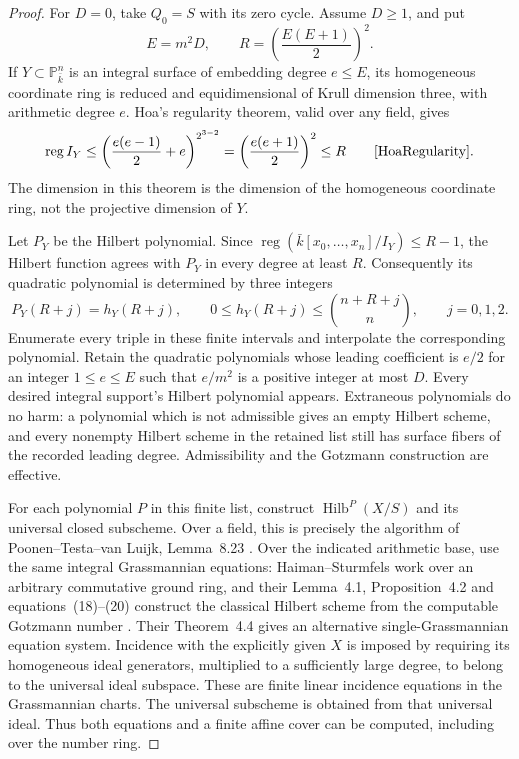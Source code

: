 \begin{proof}
For $D=0$, take $Q_0=S$ with its zero cycle. Assume $D\geq1$, and put
\[
 E=m^2D,\qquad R=\left(\frac{E(E+1)}2\right)^2.
\]
If $Y\subset\mathbb P^n_{\bar k}$ is an integral surface of embedding
degree $e\leq E$, its homogeneous coordinate ring is reduced and
equidimensional of Krull dimension three, with arithmetic degree $e$.
Hoa's regularity theorem, valid over any field, gives
\[
 \operatorname{reg}I_Y
 \leq\left(\frac{e(e-1)}2+e\right)^{2^{3-2}}
 =\left(\frac{e(e+1)}2\right)^2\leq R
 \qquad\text{\cite[Theorem 0.2, author PDF p.~2]{HoaRegularity}}.
\]
The dimension in this theorem is the dimension of the homogeneous
coordinate ring, not the projective dimension of $Y$.

Let $P_Y$ be the Hilbert polynomial. Since
$\operatorname{reg}(\bar k[x_0,\ldots,x_n]/I_Y)\leq R-1$, the
Hilbert function agrees with $P_Y$ in every degree at least $R$.
Consequently its quadratic polynomial is determined by three integers
\[
 P_Y(R+j)=h_Y(R+j),\qquad
 0\leq h_Y(R+j)\leq\binom{n+R+j}{n},\qquad j=0,1,2.
\]
Enumerate every triple in these finite intervals and interpolate the
corresponding polynomial. Retain the quadratic polynomials whose
leading coefficient is $e/2$ for an integer $1\leq e\leq E$ such
that $e/m^2$ is a positive integer at most $D$. Every desired integral
support's Hilbert polynomial appears. Extraneous polynomials do no
harm: a polynomial which is not admissible gives an empty Hilbert
scheme, and every nonempty Hilbert scheme in the retained list still
has surface fibers of the recorded leading degree. Admissibility and
the Gotzmann construction are effective.

For each polynomial $P$ in this finite list, construct
$\operatorname{Hilb}^P(X/S)$ and its universal closed subscheme.
Over a field, this is precisely the algorithm of
Poonen--Testa--van Luijk, Lemma~8.23
\cite[author PDF p.~15]{PoonenTestaVanLuijk}. Over the indicated
arithmetic base, use the same integral Grassmannian equations:
Haiman--Sturmfels work over an arbitrary commutative ground ring, and
their Lemma~4.1, Proposition~4.2 and equations~(18)--(20) construct the
classical Hilbert scheme from the computable Gotzmann number
\cite[\S4, author PDF pp.~19--21]{HaimanSturmfels}.
Their Theorem~4.4 gives an alternative single-Grassmannian equation
system. Incidence with the explicitly given $X$ is imposed by requiring
its homogeneous ideal generators, multiplied to a sufficiently large
degree, to belong to the universal ideal subspace. These are finite
linear incidence equations in the Grassmannian charts. The universal
subscheme is obtained from that universal ideal. Thus both equations
and a finite affine cover can be computed, including over the number
ring.


\end{proof}
